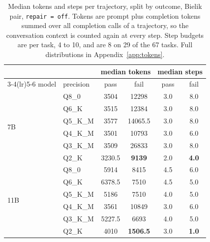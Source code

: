 \documentclass[11pt]{article}
\begin{document}
\begin{table}[h]
\centering
\caption{Median tokens and steps per trajectory, split by outcome, Bielik pair, \texttt{repair\,=\,off}. Tokens are prompt plus completion tokens summed over all completion calls of a trajectory, so the conversation context is counted again at every step. Step budgets are per task, 4 to 10, and are 8 on 29 of the 67 tasks. Full distributions in Appendix~\ref{app:tokens}.}
\label{tab:tokens}
\begin{tabular}{llcccc}
\toprule
& & \multicolumn{2}{c}{median tokens} & \multicolumn{2}{c}{median steps} \\
\cmidrule(lr){3-4}\cmidrule(lr){5-6}
model & precision & pass & fail & pass & fail \\
\midrule
\multirow{6}{*}{7B}
 & Q8\_0   & 3504 & 12298 & 3.0 & 8.0 \\
 & Q6\_K   & 3515 & 12384 & 3.0 & 8.0 \\
 & Q5\_K\_M & 3577 & 14065.5 & 3.0 & 8.0 \\
 & Q4\_K\_M & 3501 & 10793 & 3.0 & 6.0 \\
 & Q3\_K\_M & 3509 & 26833 & 3.0 & 8.0 \\
 & Q2\_K   & 3230.5 & \textbf{9139} & 2.0 & \textbf{4.0} \\
\midrule
\multirow{6}{*}{11B}
 & Q8\_0   & 5914 & 8415 & 4.5 & 6.0 \\
 & Q6\_K   & 6378.5 & 7510 & 4.5 & 5.0 \\
 & Q5\_K\_M & 5186 & 7510 & 4.0 & 5.0 \\
 & Q4\_K\_M & 3561 & 10849 & 3.0 & 6.0 \\
 & Q3\_K\_M & 5227.5 & 6693 & 4.0 & 5.0 \\
 & Q2\_K   & 4010 & \textbf{1506.5} & 3.0 & \textbf{1.0} \\
\bottomrule
\end{tabular}
\end{table}
\end{document}
